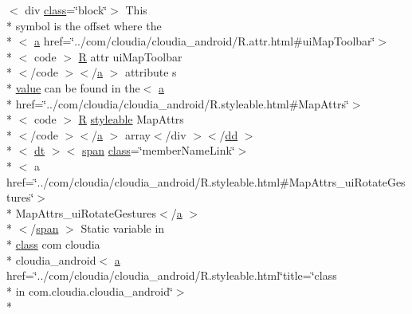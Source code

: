 \begin{DoxyCompactItemize}
$<$ div \hyperlink{_tools_8html_acf06f836132665ba8114f5a414c2403f}{class}=\char`\"{}block\char`\"{}$>$ This \\*
symbol is the offset where the\\*
$<$ \hyperlink{style_8css_a5e8981582017bb8b84c21f148345d1f7}{a} href=\char`\"{}../com/cloudia/cloudia\-\_\-android/R.\-attr.\-html\#ui\-Map\-Toolbar\char`\"{}$>$\\*
$<$ code $>$ \hyperlink{index-16_8html_a31e8fe59be5c20ce90a0090e28a0c1fe}{R} attr ui\-Map\-Toolbar\\*
$<$/code $>$$<$/\hyperlink{style_8css_a5e8981582017bb8b84c21f148345d1f7}{a} $>$ attribute s \\*
\hyperlink{_my_s_q_l_connector_8measure_8html_afcc7a4b78ecd8fa7e713f8cfa0f51017}{value} can be found in the$<$ \hyperlink{style_8css_a5e8981582017bb8b84c21f148345d1f7}{a} \\*
href=\char`\"{}../com/cloudia/cloudia\-\_\-android/R.\-styleable.\-html\#Map\-Attrs\char`\"{}$>$\\*
$<$ code $>$ \hyperlink{index-16_8html_a31e8fe59be5c20ce90a0090e28a0c1fe}{R} \hyperlink{index-17_8html_ae6c9bf1e41380184b4b665ca9ab6ba0a}{styleable} Map\-Attrs\\*
$<$/code $>$$<$/\hyperlink{style_8css_a5e8981582017bb8b84c21f148345d1f7}{a} $>$ array$<$/div $>$$<$/\hyperlink{stylesheet_8css_a47f4718a86835a7771ec592ece845221}{dd} $>$\\*
$<$ \hyperlink{stylesheet_8css_a107565fb4039d33b041380d6e0ea1d80}{dt} $>$$<$ \hyperlink{stylesheet_8css_a8343996ebcf16220b04e54659aac31cc}{span} \hyperlink{_tools_8html_acf06f836132665ba8114f5a414c2403f}{class}=\char`\"{}member\-Name\-Link\char`\"{}$>$\\*
$<$ a href=\char`\"{}../com/cloudia/cloudia\-\_\-android/R.\-styleable.\-html\#Map\-Attrs\-\_\-ui\-Rotate\-Gestures\char`\"{}$>$\\*
 Map\-Attrs\-\_\-ui\-Rotate\-Gestures$<$/\hyperlink{style_8css_a5e8981582017bb8b84c21f148345d1f7}{a} $>$\\*
$<$/\hyperlink{stylesheet_8css_a8343996ebcf16220b04e54659aac31cc}{span} $>$ Static variable in \\*
\hyperlink{_tools_8html_acf06f836132665ba8114f5a414c2403f}{class} com cloudia \\*
cloudia\-\_\-android$<$ \hyperlink{style_8css_a5e8981582017bb8b84c21f148345d1f7}{a} href=\char`\"{}../com/cloudia/cloudia\-\_\-android/R.\-styleable.\-html\char`\"{}title=\char`\"{}class \\*
in com.\-cloudia.\-cloudia\-\_\-android\char`\"{}$>$\\*

\end{DoxyCompactItemize}
